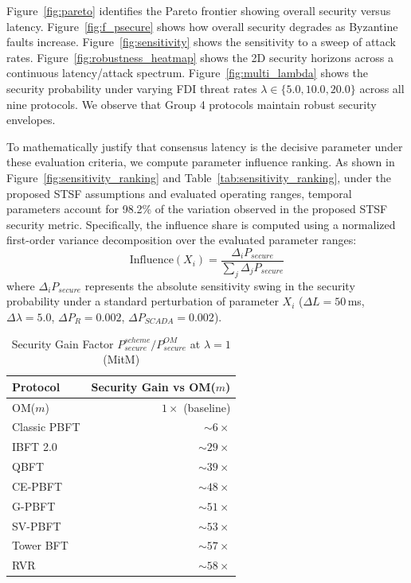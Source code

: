 \documentclass[10pt,twocolumn,letterpaper]{article}
\begin{document}
Figure~\ref{fig:pareto} identifies the Pareto frontier showing overall security versus latency. Figure~\ref{fig:f_psecure} shows how overall security degrades as Byzantine faults increase. Figure~\ref{fig:sensitivity} shows the sensitivity to a sweep of attack rates. Figure~\ref{fig:robustness_heatmap} shows the 2D security horizons across a continuous latency/attack spectrum. Figure~\ref{fig:multi_lambda} shows the security probability under varying FDI threat rates $\lambda \in \{5.0, 10.0, 20.0\}$ across all nine protocols. We observe that Group 4 protocols maintain robust security envelopes.

To mathematically justify that consensus latency is the decisive parameter under these evaluation criteria, we compute parameter influence ranking. As shown in Figure~\ref{fig:sensitivity_ranking} and Table~\ref{tab:sensitivity_ranking}, under the proposed STSF assumptions and evaluated operating ranges, temporal parameters account for 98.2\% of the variation observed in the proposed STSF security metric. Specifically, the influence share is computed using a normalized first-order variance decomposition over the evaluated parameter ranges:
\begin{equation}
\text{Influence}(X_i) = \frac{\Delta_i P_{secure}}{\sum_j \Delta_j P_{secure}}
\end{equation}
where $\Delta_i P_{secure}$ represents the absolute sensitivity swing in the security probability under a standard perturbation of parameter $X_i$ ($\Delta L = 50$\,ms, $\Delta \lambda = 5.0$, $\Delta P_R = 0.002$, $\Delta P_{SCADA} = 0.002$).

\begin{table}[htbp]
\caption{Security Gain Factor $P_{secure}^{scheme} / P_{secure}^{OM}$ at $\lambda=1$ (MitM)}
\label{tab:gain}
\centering
\scriptsize
\begin{tabular}{@{}lr@{}}
\toprule
\textbf{Protocol} & \textbf{Security Gain vs OM($m$)} \\
\midrule
OM($m$) & $1\times$ (baseline) \\
Classic PBFT & $\sim$$6\times$ \\
IBFT 2.0 & $\sim$$29\times$ \\
QBFT & $\sim$$39\times$ \\
CE-PBFT & $\sim$$48\times$ \\
G-PBFT & $\sim$$51\times$ \\
SV-PBFT & $\sim$$53\times$ \\
Tower BFT & $\sim$$57\times$ \\
RVR & $\sim$$58\times$ \\
\bottomrule
\end{tabular}
\end{table}
\end{document}
